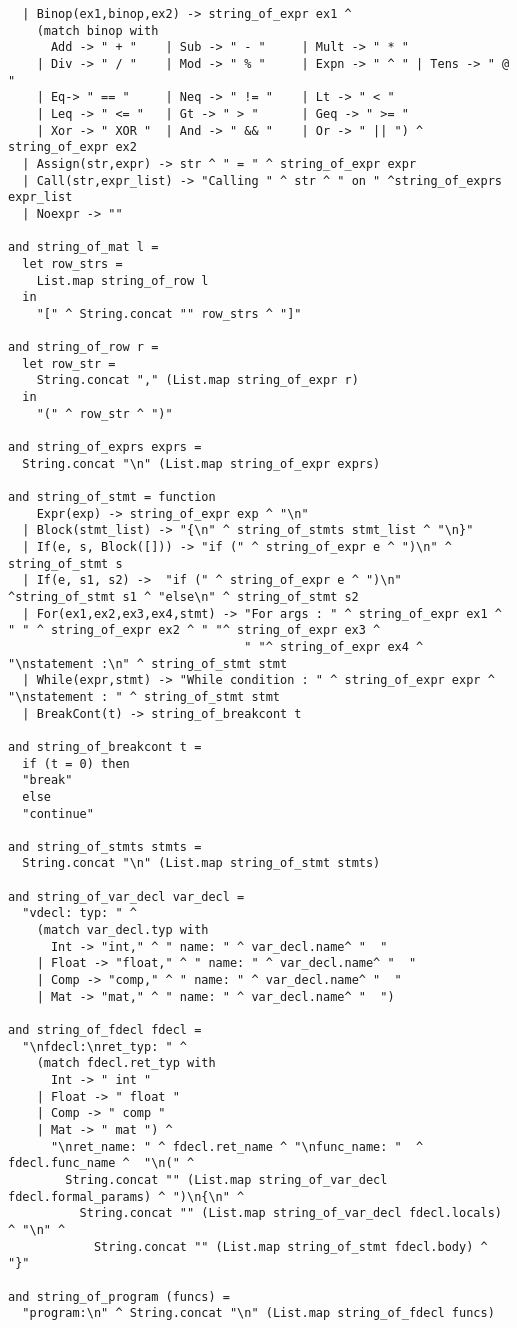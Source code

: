 \begin{lstlisting}
  | Binop(ex1,binop,ex2) -> string_of_expr ex1 ^ 
    (match binop with 
      Add -> " + "    | Sub -> " - "     | Mult -> " * " 
    | Div -> " / "    | Mod -> " % "     | Expn -> " ^ " | Tens -> " @ "
    | Eq-> " == "     | Neq -> " != "    | Lt -> " < "
    | Leq -> " <= "   | Gt -> " > "      | Geq -> " >= "
    | Xor -> " XOR "  | And -> " && "    | Or -> " || ") ^ string_of_expr ex2
  | Assign(str,expr) -> str ^ " = " ^ string_of_expr expr
  | Call(str,expr_list) -> "Calling " ^ str ^ " on " ^string_of_exprs expr_list
  | Noexpr -> ""

and string_of_mat l =
  let row_strs = 
    List.map string_of_row l
  in
    "[" ^ String.concat "" row_strs ^ "]"

and string_of_row r =
  let row_str = 
    String.concat "," (List.map string_of_expr r)
  in
    "(" ^ row_str ^ ")"
  
and string_of_exprs exprs = 
  String.concat "\n" (List.map string_of_expr exprs)

and string_of_stmt = function
    Expr(exp) -> string_of_expr exp ^ "\n"
  | Block(stmt_list) -> "{\n" ^ string_of_stmts stmt_list ^ "\n}"
  | If(e, s, Block([])) -> "if (" ^ string_of_expr e ^ ")\n" ^ string_of_stmt s
  | If(e, s1, s2) ->  "if (" ^ string_of_expr e ^ ")\n" ^string_of_stmt s1 ^ "else\n" ^ string_of_stmt s2
  | For(ex1,ex2,ex3,ex4,stmt) -> "For args : " ^ string_of_expr ex1 ^ " " ^ string_of_expr ex2 ^ " "^ string_of_expr ex3 ^ 
                                 " "^ string_of_expr ex4 ^ "\nstatement :\n" ^ string_of_stmt stmt 
  | While(expr,stmt) -> "While condition : " ^ string_of_expr expr ^ "\nstatement : " ^ string_of_stmt stmt
  | BreakCont(t) -> string_of_breakcont t

and string_of_breakcont t =
  if (t = 0) then
  "break"
  else
  "continue"

and string_of_stmts stmts = 
  String.concat "\n" (List.map string_of_stmt stmts) 

and string_of_var_decl var_decl = 
  "vdecl: typ: " ^ 
    (match var_decl.typ with
      Int -> "int," ^ " name: " ^ var_decl.name^ "  "
    | Float -> "float," ^ " name: " ^ var_decl.name^ "  "
    | Comp -> "comp," ^ " name: " ^ var_decl.name^ "  "
    | Mat -> "mat," ^ " name: " ^ var_decl.name^ "  ")
  
and string_of_fdecl fdecl =
  "\nfdecl:\nret_typ: " ^ 
    (match fdecl.ret_typ with
      Int -> " int "
    | Float -> " float "
    | Comp -> " comp "
    | Mat -> " mat ") ^
      "\nret_name: " ^ fdecl.ret_name ^ "\nfunc_name: "  ^ fdecl.func_name ^  "\n(" ^
        String.concat "" (List.map string_of_var_decl fdecl.formal_params) ^ ")\n{\n" ^
          String.concat "" (List.map string_of_var_decl fdecl.locals) ^ "\n" ^
            String.concat "" (List.map string_of_stmt fdecl.body) ^ "}"

and string_of_program (funcs) = 
  "program:\n" ^ String.concat "\n" (List.map string_of_fdecl funcs)
\end{lstlisting}

